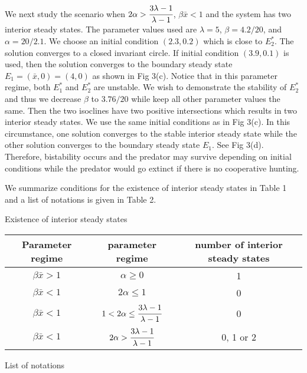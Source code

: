 \documentclass[11pt]{article}
\begin{document}
We next study the scenario when
$2\alpha>\cfrac{3\lambda-1}{\lambda-1}$, $\beta \bar x<1$ and the
system has two interior steady states. The parameter values used
are $\lambda=5$, $\beta=4.2/20$, and $\alpha=20/2.1$. We choose an
initial condition $(2.3, 0.2)$ which is close to $E_2^*$. The
solution converges to a closed invariant circle. If initial
condition $(3.9, 0.1)$ is used, then the solution converges to the
boundary steady state $E_1=(\bar x, 0)=(4, 0)$ as shown in Fig
3(c). Notice that in this parameter regime, both $E_1^*$ and
$E_2^*$ are unstable. We wish to demonstrate the stability of
$E_2^*$ and thus we decrease $\beta$ to $3.76/20$ while keep all
other parameter values the same. Then the two isoclines have two
positive intersections which results in two interior steady
states. We use the same initial conditions as in Fig 3(c). In this
circumstance,   one solution converges to the stable interior
steady state while the other solution converges to the boundary
steady state $E_1$. See Fig 3(d). Therefore, bistability occurs
and the predator may survive depending on initial conditions while
the predator would go extinct if there is no cooperative hunting.

\medskip



We summarize conditions for the existence of interior steady
states in Table 1 and a list of notations is given in Table 2.

\bigskip


 Existence of interior steady states

\medskip

\begin{tabular}{ccc}\hline
 Parameter regime & parameter regime & number of interior steady states\\
 \hline
 $\beta \bar x>1$ &$\alpha\geq 0$ & 1\\[1ex]
 $\beta  \bar x<1$ & $2\alpha\leq 1$ & 0\\[1ex]
 $\beta  \bar x<1$ & $1<2\alpha\leq \cfrac{3\lambda-1}{\lambda-1}$ &
 0\\[1.5ex]
$\beta \bar x<1$ & $2\alpha>\cfrac{3\lambda-1}{\lambda-1}$ & 0, 1
or
 2\\
 \hline
 \end{tabular}


\bigskip


 List of notations

\medskip
\end{document}
